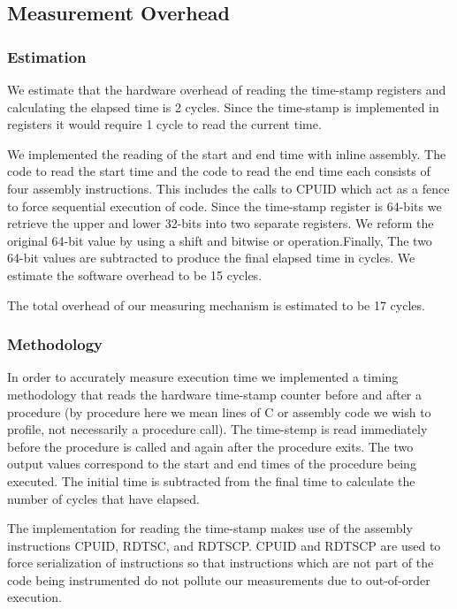\subsection{Measurement Overhead}

\subsubsection{Estimation}

We estimate that the hardware overhead of reading the time-stamp registers and
calculating the elapsed time is 2 cycles. Since the time-stamp is implemented in
registers it would require 1 cycle to read the current time. 

We implemented the reading of the start and end time with inline assembly. The
code to read the start time and the code to read the end time each consists of
four assembly instructions. This includes the calls to CPUID which act as a
fence to force sequential execution of code.  Since the time-stamp register is
64-bits we retrieve the upper and lower 32-bits into two separate registers. We
reform the original 64-bit value by using a shift and bitwise or
operation.Finally,  The two 64-bit values are subtracted to produce the final
elapsed time in cycles. We estimate the software overhead to be 15 cycles.

The total overhead of our measuring mechanism is estimated to be 17 cycles.

\subsubsection{Methodology}

In order to accurately measure execution time we implemented a timing
methodology that reads the hardware time-stamp counter before and after a
procedure (by procedure here we mean lines of C or assembly code we wish to
profile, not necessarily a procedure call).  The time-stemp is read immediately
before the procedure is called and again after the procedure exits. The two
output values correspond to the start and end times of the procedure being
executed. The initial time is subtracted from the final time to calculate the
number of cycles that have elapsed.

The implementation for reading the time-stamp makes use of the assembly
instructions CPUID, RDTSC, and RDTSCP. CPUID and RDTSCP are used to force
serialization of instructions so that instructions which are not part of the
code being instrumented do not pollute our measurements due to out-of-order
execution.\cite{intel}

